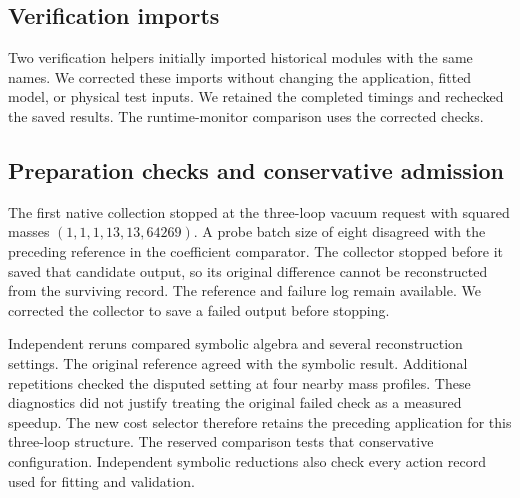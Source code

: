 \subsection{Verification imports}
Two verification helpers initially imported historical modules with the same names. We corrected these imports without changing the application, fitted model, or physical test inputs. We retained the completed timings and rechecked the saved results. The runtime-monitor comparison uses the corrected checks.

\subsection{Preparation checks and conservative admission}
The first native collection stopped at the three-loop vacuum request with squared masses $(1,1,1,13,13,64269)$. A probe batch size of eight disagreed with the preceding reference in the coefficient comparator. The collector stopped before it saved that candidate output, so its original difference cannot be reconstructed from the surviving record. The reference and failure log remain available. We corrected the collector to save a failed output before stopping.

Independent reruns compared symbolic algebra and several reconstruction settings. The original reference agreed with the symbolic result. Additional repetitions checked the disputed setting at four nearby mass profiles. These diagnostics did not justify treating the original failed check as a measured speedup. The new cost selector therefore retains the preceding application for this three-loop structure. The reserved comparison tests that conservative configuration. Independent symbolic reductions also check every action record used for fitting and validation.
